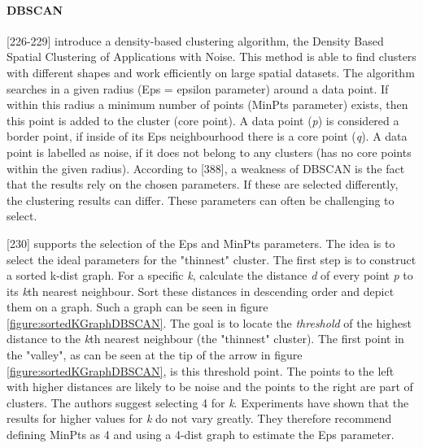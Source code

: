 


\paragraph{DBSCAN}
\label{section:DBSCAN}
\textcite{DBSCAN}[226-229] introduce a density-based clustering algorithm, the Density Based Spatial Clustering of Applications with Noise. This method is able to find clusters with different shapes and work efficiently on large spatial datasets. The algorithm searches in a given radius (Eps = epsilon parameter) around a data point. If within this radius a minimum number of points (MinPts parameter) exists, then this point is added to the cluster (core point). A data point (\textit{p}) is considered a border point, if inside of its Eps neighbourhood there is a core point (\textit{q}). A data point is labelled as noise, if it does not belong to any clusters (has no core points within the given radius).
According to \textcite{han2011data}[388], a weakness of DBSCAN is the fact that the results rely on the chosen parameters. If these are selected differently, the clustering results can differ. These parameters can often be challenging to select.

\textcite{DBSCAN}[230] supports the selection of the Eps and MinPts parameters. The idea is to select the ideal parameters for the "thinnest" cluster. The first step is to construct a sorted k-dist graph. For a specific \textit{k}, calculate the distance \textit{d} of every point \textit{p} to its \textit{k}th nearest neighbour. Sort these distances in descending order and depict them on a graph. Such a graph can be seen in figure \ref{figure:sortedKGraphDBSCAN}. The goal is to locate the \textit{threshold} of the highest distance to the \textit{k}th nearest neighbour (the "thinnest" cluster). The first point in the "valley", as can be seen at the tip of the arrow in figure \ref{figure:sortedKGraphDBSCAN}, is this threshold point. The points to the left with higher distances are likely to be noise and the points to the right are part of clusters. The authors suggest selecting 4 for \textit{k}. Experiments have shown that the results for higher values for \textit{k} do not vary greatly. They therefore recommend defining MinPts as 4 and using a 4-dist graph to estimate the Eps parameter.


